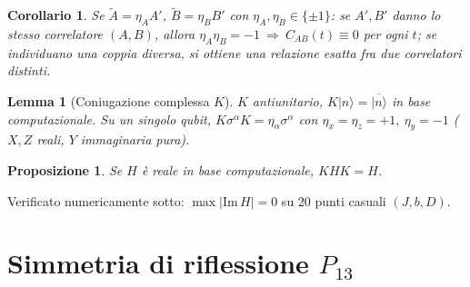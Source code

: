 \documentclass[11pt,a4paper]{article}
\newtheorem{lemma}{Lemma}
\newtheorem{proposizione}{Proposizione}
\newtheorem{corollario}{Corollario}
\newcommand{\ket}[1]{\lvert #1 \rangle}
\begin{document}
\begin{corollario}
\label{cor:zero-unitario}
Se $\widetilde A=\eta_A A'$, $\widetilde B=\eta_B B'$ con $\eta_A,\eta_B\in\{\pm1\}$: se $A',B'$
danno lo stesso correlatore $(A,B)$, allora $\eta_A\eta_B=-1\ \Rightarrow\ C_{AB}(t)\equiv0$ per
ogni $t$; se individuano una coppia \emph{diversa}, si ottiene una relazione esatta fra due
correlatori distinti.
\end{corollario}

\begin{lemma}[Coniugazione complessa $K$]
\label{lem:K}
$K$ antiunitario, $K\ket{n}=\overline{\ket n}$ in base computazionale. Su un singolo qubit,
$K\sigma^\alpha K = \eta_\alpha\sigma^\alpha$ con $\eta_x=\eta_z=+1,\ \eta_y=-1$ ($X,Z$ reali,
$Y$ immaginaria pura).
\end{lemma}

\begin{proposizione}
\label{prop:H-reale}
Se $H$ è reale in base computazionale, $KHK=H$.
\end{proposizione}
Verificato numericamente sotto: $\max|\mathrm{Im}\,H|=0$ su 20 punti casuali $(J,b,D)$.

\section{Simmetria di riflessione \texorpdfstring{$P_{13}$}{P13}}
\label{sec:P13}
\end{document}
